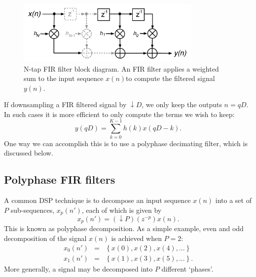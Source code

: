 \documentclass{ws-rv961x669}
\begin{document}
\begin{figure}
 \centering
 \includegraphics[width=0.8\textwidth]{./figures/fir_filter}
 
 \caption{N-tap FIR filter block diagram. An FIR filter applies a weighted sum to the input sequence $x(n)$to compute the filtered signal $y(n)$. \label{fig:fir}}
\end{figure}

If downsampling a FIR filtered signal by $\downarrow D$, we only keep the outputs $n=qD$. %
In such cases it is more efficient to only compute the terms we wish to keep: 
\begin{equation}
y(qD)=\sum_{k=0}^{K-1}h(k)x(qD-k).\label{eq:FIR-filter-decimated}
\end{equation}
One way we can accomplish this is to use a polyphase decimating filter, which is discussed below. 



\subsection{Polyphase FIR filters}\label{sub:pfir}

A common DSP technique is to decompose an input sequence $x(n)$ into a set
of $P$ sub-sequences, $x_{p}(n')$, each of which is given by 
\begin{equation}
x_{p}(n')=(\downarrow P)(z^{-p})x(n).
\end{equation}
This is known as polyphase decomposition\cite{Vaidyanathan:1990p6127}. As a simple example, even and odd decomposition of the signal $x(n)$ is achieved when $P=\mbox{2}$:
\begin{eqnarray}
x_{0}(n') & = & \left\{ x(0),x(2),x(4),...\right\} \\
x_{1}(n') & = & \left\{ x(1),x(3),x(5),...\right\} .
\end{eqnarray}
More generally, a signal may be decomposed into $P$ different `phases'.
\end{document}
